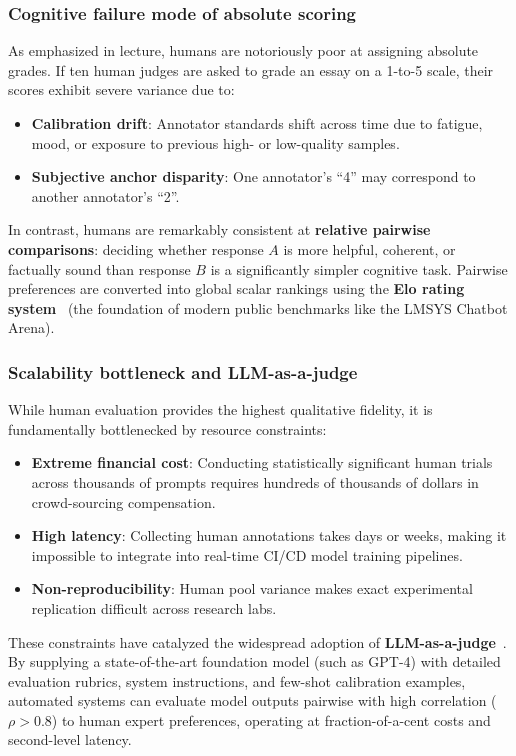 \documentclass[../../../main.tex]{subfiles}
\begin{document}
\subsubsection{Cognitive failure mode of absolute scoring}
As emphasized in lecture, humans are notoriously poor at assigning absolute grades. If ten human judges are asked to grade an essay on a 1-to-5 scale, their scores exhibit severe variance due to:
\begin{itemize}
    \item \textbf{Calibration drift}: Annotator standards shift across time due to fatigue, mood, or exposure to previous high- or low-quality samples.
    \item \textbf{Subjective anchor disparity}: One annotator's ``4'' may correspond to another annotator's ``2''.
\end{itemize}
In contrast, humans are remarkably consistent at \textbf{relative pairwise comparisons}: deciding whether response $A$ is more helpful, coherent, or factually sound than response $B$ is a significantly simpler cognitive task. Pairwise preferences are converted into global scalar rankings using the \textbf{Elo rating system}~\cite{zheng2023judging} (the foundation of modern public benchmarks like the LMSYS Chatbot Arena).

\subsubsection{Scalability bottleneck and LLM-as-a-judge}
While human evaluation provides the highest qualitative fidelity, it is fundamentally bottlenecked by resource constraints:
\begin{itemize}
    \item \textbf{Extreme financial cost}: Conducting statistically significant human trials across thousands of prompts requires hundreds of thousands of dollars in crowd-sourcing compensation.
    \item \textbf{High latency}: Collecting human annotations takes days or weeks, making it impossible to integrate into real-time CI/CD model training pipelines.
    \item \textbf{Non-reproducibility}: Human pool variance makes exact experimental replication difficult across research labs.
\end{itemize}

These constraints have catalyzed the widespread adoption of \textbf{LLM-as-a-judge}~\cite{zheng2023judging}. By supplying a state-of-the-art foundation model (such as GPT-4) with detailed evaluation rubrics, system instructions, and few-shot calibration examples, automated systems can evaluate model outputs pairwise with high correlation ($\rho > 0.8$) to human expert preferences, operating at fraction-of-a-cent costs and second-level latency.
\end{document}

